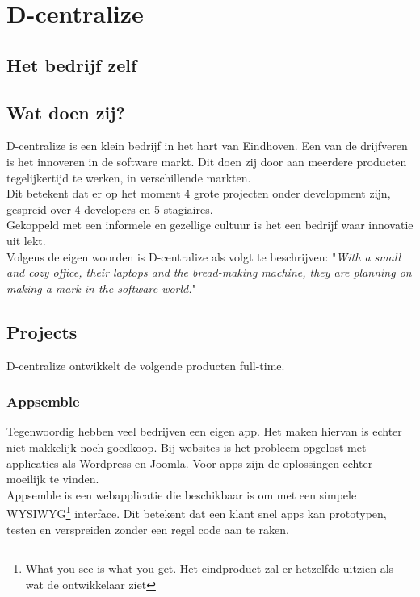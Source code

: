 \chapter{D-centralize}

\section{Het bedrijf zelf}


\section{Wat doen zij?}
D-centralize is een klein bedrijf in het hart van Eindhoven. Een van de drijfveren is het innoveren in de software markt. Dit doen zij door aan meerdere producten tegelijkertijd te werken, in verschillende markten. \\

Dit betekent dat er op het moment 4 grote projecten onder development zijn, gespreid over 4 developers en 5 stagiaires. \\

Gekoppeld met een informele en gezellige cultuur is het een bedrijf waar innovatie uit lekt. \\

Volgens de eigen woorden is D-centralize als volgt te beschrijven: "\textit{With a small and cozy office, their laptops and the bread-making machine, they are planning on making a mark in the software world.}" \cite{dcent1}

\section{Projects}

D-centralize ontwikkelt de volgende producten full-time.

\subsection{Appsemble}

Tegenwoordig hebben veel bedrijven een eigen app. Het maken hiervan is echter niet makkelijk noch goedkoop. Bij websites is het probleem opgelost met applicaties als Wordpress en Joomla. Voor apps zijn de oplossingen echter moeilijk te vinden. \\

Appsemble is een webapplicatie die beschikbaar is om met een simpele WYSIWYG\footnote{What you see is what you get. Het eindproduct zal er hetzelfde uitzien als wat de ontwikkelaar ziet} interface. Dit betekent dat een klant snel apps kan prototypen, testen en verspreiden zonder een regel code aan te raken. \\

